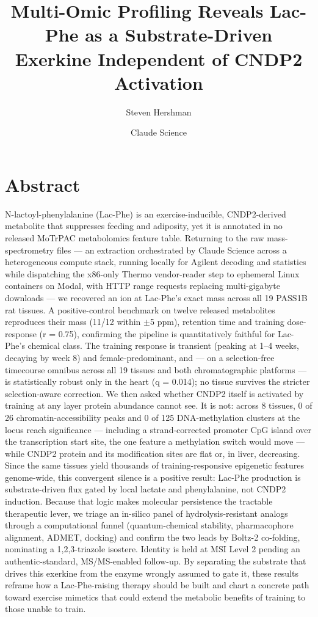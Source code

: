 \documentclass[11pt]{article}
\title{\vspace{-2em}Multi-Omic Profiling Reveals Lac-Phe as a Substrate-Driven\\
Exerkine Independent of CNDP2 Activation}
\author[1]{Steven Hershman}
\author[2]{Claude Science}
\affil[1]{Independent Researcher}
\affil[2]{Anthropic}
\date{}
\begin{document}
\maketitle


\section*{Abstract}

N-lactoyl-phenylalanine (Lac-Phe) is an exercise-inducible, CNDP2-derived metabolite
that suppresses feeding and adiposity, yet it is annotated in no released MoTrPAC
metabolomics feature table. Returning to the raw mass-spectrometry files --- an extraction
orchestrated by Claude Science across a heterogeneous compute stack, running locally for
Agilent decoding and statistics while dispatching the x86-only Thermo vendor-reader step to
ephemeral Linux containers on Modal, with HTTP range requests replacing multi-gigabyte
downloads --- we recovered an ion at Lac-Phe's exact mass across all 19 PASS1B rat tissues.
A positive-control benchmark on twelve released metabolites reproduces their mass (11/12
within $\pm$5 ppm), retention time and training dose-response (r = 0.75), confirming the
pipeline is quantitatively faithful for Lac-Phe's chemical class. The training response is
transient (peaking at 1--4 weeks, decaying by week 8) and female-predominant, and --- on a
selection-free timecourse omnibus across all 19 tissues and both chromatographic platforms
--- is statistically robust only in the heart (q = 0.014); no tissue survives the stricter
selection-aware correction. We then asked whether CNDP2 itself is activated by training at
any layer protein abundance cannot see. It is not: across 8 tissues, 0 of 26
chromatin-accessibility peaks and 0 of 125 DNA-methylation clusters at the locus reach
significance --- including a strand-corrected promoter CpG island over the transcription
start site, the one feature a methylation switch would move --- while CNDP2 protein and its
modification sites are flat or, in liver, decreasing. Since the same tissues yield thousands
of training-responsive epigenetic features genome-wide, this convergent silence is a
positive result: Lac-Phe production is substrate-driven flux gated by local lactate and
phenylalanine, not CNDP2 induction. Because that logic makes molecular persistence the
tractable therapeutic lever, we triage an in-silico panel of hydrolysis-resistant analogs
through a computational funnel (quantum-chemical stability, pharmacophore alignment, ADMET,
docking) and confirm the two leads by Boltz-2 co-folding, nominating a 1,2,3-triazole
isostere. Identity is held at MSI Level 2 pending an authentic-standard, MS/MS-enabled
follow-up. By separating the substrate that drives this exerkine from the enzyme wrongly
assumed to gate it, these results reframe how a Lac-Phe-raising therapy should be built and
chart a concrete path toward exercise mimetics that could extend the metabolic benefits of
training to those unable to train.
\end{document}
